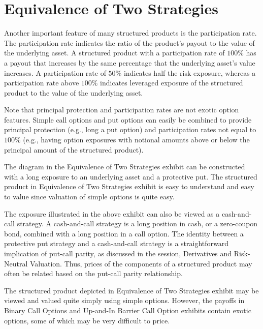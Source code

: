 \documentclass[11pt]{article}
\begin{document}
\section*{Equivalence of Two Strategies}
Another important feature of many structured products is the participation rate. The participation rate indicates the ratio of the product's payout to the value of the underlying asset. A structured product with a participation rate of $100 \%$ has a payout that increases by the same percentage that the underlying asset's value increases. A participation rate of $50 \%$ indicates half the risk exposure, whereas a participation rate above $100 \%$ indicates leveraged exposure of the structured product to the value of the underlying asset.

Note that principal protection and participation rates are not exotic option features. Simple call options and put options can easily be combined to provide principal protection (e.g., long a put option) and participation rates not equal to $100 \%$ (e.g., having option exposures with notional amounts above or below the principal amount of the structured product).

The diagram in the Equivalence of Two Strategies exhibit can be constructed with a long exposure to an underlying asset and a protective put. The structured product in Equivalence of Two Strategies exhibit is easy to understand and easy to value since valuation of simple options is quite easy.

The exposure illustrated in the above exhibit can also be viewed as a cash-and-call strategy. A cash-and-call strategy is a long position in cash, or a zero-coupon bond, combined with a long position in a call option. The identity between a protective put strategy and a cash-and-call strategy is a straightforward implication of put-call parity, as discussed in the session, Derivatives and Risk-Neutral Valuation. Thus, prices of the components of a structured product may often be related based on the put-call parity relationship.

The structured product depicted in Equivalence of Two Strategies exhibit may be viewed and valued quite simply using simple options. However, the payoffs in Binary Call Options and Up-and-In Barrier Call Option exhibits contain exotic options, some of which may be very difficult to price.
\end{document}
